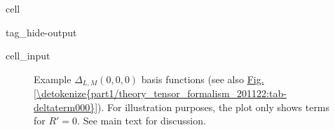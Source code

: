 \documentclass[letterpaper,table,10pt,english]{jupyterBook}
\begin{document}
\begin{sphinxuseclass}{cell}
\begin{sphinxuseclass}{tag_hide-output}
\begin{sphinxVerbatimInput}
\begin{sphinxuseclass}{cell_input}
\begin{sphinxVerbatim}[commandchars=\\\{\}]
  
   
\end{sphinxVerbatim}

\end{sphinxuseclass}\end{sphinxVerbatimInput}

\end{sphinxuseclass}
\end{sphinxuseclass}
\begin{figure}[htbp]
\centering
\capstart

\noindent{}
\caption{Example \(\Delta_{L,M}(0,0,0)\) basis functions (see also \hyperref[\detokenize{part1/theory_tensor_formalism_201122:tab-deltaterm000}]{Fig.\@ \ref{\detokenize{part1/theory_tensor_formalism_201122:tab-deltaterm000}}}). For illustration purposes, the plot only shows terms for \(R'=0\). See main text for discussion.}\label{\detokenize{part1/theory_tensor_formalism_201122:fig-deltaterm000}}\end{figure}
\end{document}
